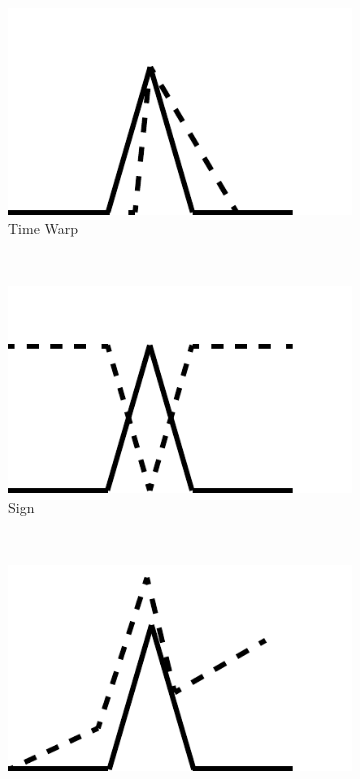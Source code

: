 {\begin{figure}
 	\begin{subfigure}{.45\columnwidth}
 		\includegraphics[width=\textwidth]{./figures/invariants/warp}
 		\caption{Time Warp}
 	\end{subfigure}
 	~
 	\begin{subfigure}{.45\columnwidth}
 		\includegraphics[width=\textwidth]{./figures/invariants/sign}
 		\caption{Sign}
 	\end{subfigure}
 	~
 	\begin{subfigure}{.45\columnwidth}
 		\includegraphics[width=\textwidth]{./figures/invariants/trend}

\end{subfigure}
\end{figure}}
